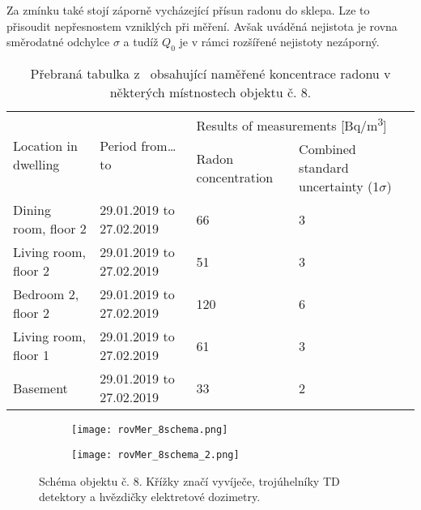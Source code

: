 Za zmínku také stojí záporně vycházející přísun radonu do sklepa. Lze to přisoudit nepřesnostem vzniklých při měření. Avšak uváděná nejistota je rovna směrodatné odchylce $\sigma$ a tudíž $Q_0$ je v rámci rozšířené nejistoty nezáporný.
\shorthandoff{-}
\begin{table}[ht]
	\centering
    \caption{Přebraná tabulka z~\cite{rovMer_8Rn} obsahující naměřené koncentrace radonu v některých místnostech objektu č. 8.}
	\label{tab:rovMer_8diskuze}
	\begin{tabular}{llp{2cm}p{3cm}}
		\toprule
		\multirow{2}{*}{Location in dwelling} & \multirow{2}{*}{Period from\ldots to}  & \multicolumn{2}{l}{Results of measurements [\si{Bq/m^3}]} \\
		\cline{3-4}
		&   & Radon concentration   & Combined standard uncertainty (1$\sigma$)   \\
		\midrule
		Dining room, floor 2    & 29.01.2019 to 27.02.2019 & 66 & 3  \\
		Living room,   floor 2 & 29.01.2019   to 27.02.2019 & 51  & 3 \\
		Bedroom 2, floor 2& 29.01.2019   to 27.02.2019 & 120  & 6   \\
		Living room, floor 1 &29.01.2019   to 27.02.2019 & 61 & 3  \\
		Basement   & 29.01.2019   to 27.02.2019 & 33  & 2 \\
		\bottomrule
	\end{tabular}
\end{table}
\shorthandon{-}
\begin{figure}[ht]
    \centering
    \begin{subfigure}{.49\textwidth}
        \texttt{[image: rovMer\_8schema.png]}
    \end{subfigure}
    \begin{subfigure}{.49\textwidth}
        \texttt{[image: rovMer\_8schema\_2.png]}
    \end{subfigure}
    \caption{Schéma objektu č. 8. Křížky značí vyvíječe, trojúhelníky TD detektory a hvězdičky elektretové dozimetry. \cite{rovMer_8Rn}}
    \label{fig:rovMer_8schema}
\end{figure}

